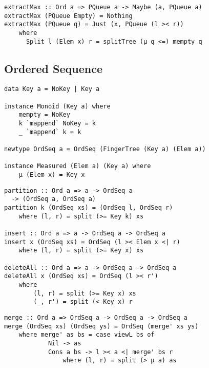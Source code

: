 \begin{frame}[fragile]
\begin{verbatim}
extractMax :: Ord a => PQueue a -> Maybe (a, PQueue a)
extractMax (PQueue Empty) = Nothing
extractMax (PQueue q) = Just (x, PQueue (l >< r))
    where 
      Split l (Elem x) r = splitTree (μ q <=) mempty q
\end{verbatim}
\end{frame}

\subsection{Ordered Sequence}
\begin{frame}[fragile]
\begin{verbatim}
data Key a = NoKey | Key a

instance Monoid (Key a) where
    mempty = NoKey
    k `mappend` NoKey = k
    _ `mappend` k = k

newtype OrdSeq a = OrdSeq (FingerTree (Key a) (Elem a))

instance Measured (Elem a) (Key a) where
    μ (Elem x) = Key x
\end{verbatim}
\end{frame}

\begin{frame}[fragile]
\begin{verbatim}
partition :: Ord a => a -> OrdSeq a
  -> (OrdSeq a, OrdSeq a)
partition k (OrdSeq xs) = (OrdSeq l, OrdSeq r)
    where (l, r) = split (>= Key k) xs

insert :: Ord a => a -> OrdSeq a -> OrdSeq a
insert x (OrdSeq xs) = OrdSeq (l >< Elem x <| r)
    where (l, r) = split (>= Key x) xs

deleteAll :: Ord a => a -> OrdSeq a -> OrdSeq a
deleteAll x (OrdSeq xs) = OrdSeq (l >< r')
    where
        (l, r) = split (>= Key x) xs
        (_, r') = split (< Key x) r
\end{verbatim}
\end{frame}

\begin{frame}[fragile]
\begin{verbatim}
merge :: Ord a => OrdSeq a -> OrdSeq a -> OrdSeq a
merge (OrdSeq xs) (OrdSeq ys) = OrdSeq (merge' xs ys)
    where merge' as bs = case viewL bs of
            Nil -> as
            Cons a bs -> l >< a <| merge' bs r
                where (l, r) = split (> μ a) as
\end{verbatim}
\end{frame}